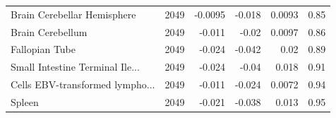 \documentclass{article}
\begin{document}
\begin{table}[h!]
\begin{tabular}{lrrrrr}
  Brain Cerebellar Hemisphere & 2049 & -0.0095 & -0.018 & 0.0093 & 0.85 \\ 
  Brain Cerebellum & 2049 & -0.011 & -0.02 & 0.0097 & 0.86 \\ 
  Fallopian Tube & 2049 & -0.024 & -0.042 & 0.02 & 0.89 \\ 
  Small Intestine Terminal Ile... & 2049 & -0.024 & -0.04 & 0.018 & 0.91 \\ 
  Cells EBV-transformed lympho... & 2049 & -0.011 & -0.024 & 0.0072 & 0.94 \\ 
  Spleen & 2049 & -0.021 & -0.038 & 0.013 & 0.95 \\ 
   \hline
\end{tabular}
\thispagestyle{empty}
\end{table}

\begin{table}[h!]
\renewcommand{\thetable}{S\arabic{table}}
\centering
\tiny
\caption{Prediction of height using 74,000 most significant independent loci and the corresponding intersecting set of variants for each method}
\thispagestyle{empty}
\end{table}
\end{document}
